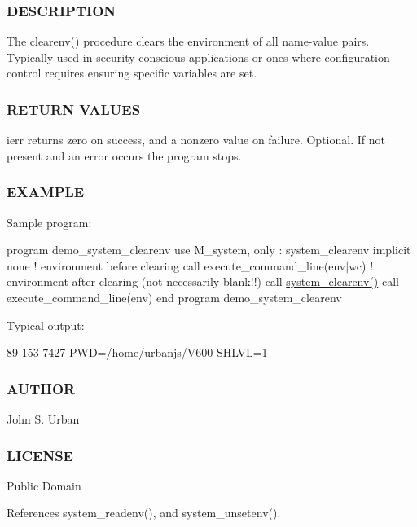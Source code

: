 \subsubsection*{D\+E\+S\+C\+R\+I\+P\+T\+I\+ON}

The clearenv() procedure clears the environment of all name-\/value pairs. Typically used in security-\/conscious applications or ones where configuration control requires ensuring specific variables are set.

\subsubsection*{R\+E\+T\+U\+RN V\+A\+L\+U\+ES}

ierr returns zero on success, and a nonzero value on failure. Optional. If not present and an error occurs the program stops.

\subsubsection*{E\+X\+A\+M\+P\+LE}

Sample program\+:

program demo\+\_\+system\+\_\+clearenv use M\+\_\+system, only \+: system\+\_\+clearenv implicit none ! environment before clearing call execute\+\_\+command\+\_\+line(\textquotesingle{}env$\vert$wc\textquotesingle{}) ! environment after clearing (not necessarily blank!!) call \mbox{\hyperlink{namespacem__system_a9c34787b170ab8d41000d7c3acb60736}{system\+\_\+clearenv()}} call execute\+\_\+command\+\_\+line(\textquotesingle{}env\textquotesingle{}) end program demo\+\_\+system\+\_\+clearenv

Typical output\+:

89 153 7427 P\+WD=/home/urbanjs/\+V600 S\+H\+L\+VL=1

\subsubsection*{A\+U\+T\+H\+OR}

John S. Urban \subsubsection*{L\+I\+C\+E\+N\+SE}

Public Domain 

References system\+\_\+readenv(), and system\+\_\+unsetenv().

